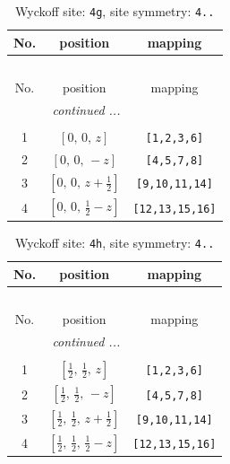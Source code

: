 \documentclass[fleqn,8pt]{jsarticle}
\begin{document}
\renewcommand{\arraystretch}{1.2}
\begin{longtable}{ccc}
\caption{Wyckoff site: {\tt 4g}, site symmetry: {\tt 4..}}
 \\
 \hline \hline
No. & position & mapping \\ \hline \endfirsthead

\multicolumn{2}{l}{\tablename\ \thetable{}} \\
 \hline \hline
No. & position & mapping \\ \hline \endhead

 \hline \hline
\multicolumn{2}{r}{\footnotesize\it continued ...} \\ \endfoot

 \hline \hline
\multicolumn{2}{r}{} \\ \endlastfoot

1 & $\left[ 0,\, 0,\, z \right]$ & {\tt [1,2,3,6]} \\ \hline
2 & $\left[ 0,\, 0,\, - z \right]$ & {\tt [4,5,7,8]} \\ \hline
3 & $\left[ 0,\, 0,\, z + \frac{1}{2} \right]$ & {\tt [9,10,11,14]} \\ \hline
4 & $\left[ 0,\, 0,\, \frac{1}{2} - z \right]$ & {\tt [12,13,15,16]} \\
\end{longtable}
\renewcommand{\arraystretch}{1.2}
\begin{longtable}{ccc}
\caption{Wyckoff site: {\tt 4h}, site symmetry: {\tt 4..}}
 \\
 \hline \hline
No. & position & mapping \\ \hline \endfirsthead

\multicolumn{2}{l}{\tablename\ \thetable{}} \\
 \hline \hline
No. & position & mapping \\ \hline \endhead

 \hline \hline
\multicolumn{2}{r}{\footnotesize\it continued ...} \\ \endfoot

 \hline \hline
\multicolumn{2}{r}{} \\ \endlastfoot

1 & $\left[ \frac{1}{2},\, \frac{1}{2},\, z \right]$ & {\tt [1,2,3,6]} \\ \hline
2 & $\left[ \frac{1}{2},\, \frac{1}{2},\, - z \right]$ & {\tt [4,5,7,8]} \\ \hline
3 & $\left[ \frac{1}{2},\, \frac{1}{2},\, z + \frac{1}{2} \right]$ & {\tt [9,10,11,14]} \\ \hline
4 & $\left[ \frac{1}{2},\, \frac{1}{2},\, \frac{1}{2} - z \right]$ & {\tt [12,13,15,16]} \\
\end{longtable}
\end{document}
